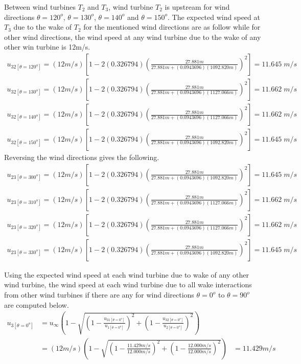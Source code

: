 	Between wind turbines $T_2$ and $T_3$, wind turbine $T_2$ is upstream for wind directions $\theta=120^o$, $\theta=130^o$, $\theta=140^o$ and $\theta=150^o$. The expected wind speed at $T_3$ due to the wake of $T_2$ for the mentioned wind directions are as follow while for other wind directions, the wind speed at any wind turbine due to the wake of any other win turbine is 12m/s.
	\begin{align*}
	    u_{32[\theta=120^o]} = (12m/s) \left[ 1-2(0.326794)\left( \frac{27.881m}{27.881m+(0.0943696) (1092.820m)} \right)^2 \right] = 11.645\;m/s \\
	    u_{32[\theta=130^o]} = (12m/s) \left[ 1-2(0.326794)\left( \frac{27.881m}{27.881m+(0.0943696) (1127.066m)} \right)^2 \right] = 11.662\;m/s \\
	    u_{32[\theta=140^o]} = (12m/s) \left[ 1-2(0.326794)\left( \frac{27.881m}{27.881m+(0.0943696) (1127.066m)} \right)^2 \right] = 11.662\;m/s \\
	    u_{32[\theta=150^o]} = (12m/s) \left[ 1-2(0.326794)\left( \frac{27.881m}{27.881m+(0.0943696) (1092.820m)} \right)^2 \right] = 11.645\;m/s
	\end{align*}
	Reversing the wind directions gives the following.
	\begin{align*}
	    u_{23[\theta=300^o]} = (12m/s) \left[ 1-2(0.326794)\left( \frac{27.881m}{27.881m+(0.0943696) (1092.820m)} \right)^2 \right] = 11.645\;m/s \\
	    u_{23[\theta=310^o]} = (12m/s) \left[ 1-2(0.326794)\left( \frac{27.881m}{27.881m+(0.0943696) (1127.066m)} \right)^2 \right] = 11.662\;m/s \\
	    u_{23[\theta=320^o]} = (12m/s) \left[ 1-2(0.326794)\left( \frac{27.881m}{27.881m+(0.0943696) (1127.066m)} \right)^2 \right] = 11.662\;m/s \\
	    u_{23[\theta=330^o]} = (12m/s) \left[ 1-2(0.326794)\left( \frac{27.881m}{27.881m+(0.0943696) (1092.820m)} \right)^2 \right] = 11.645\;m/s
	\end{align*}
	
	Using the expected wind speed at each wind turbine due to wake of any other wind turbine, the wind speed at each wind turbine due to all wake interactions from other wind turbines if there are any for  wind directions $\theta=0^o$ to $\theta=90^o$ are computed below.
	\begin{align*}
	    u_{3[\theta=0^o]} &= u_\infty\left( 1-\sqrt{\left( 1-\frac{u_{31[\theta=0^o]}}{u_{1[\theta=0^o]}} \right)^2 + \left( 1-\frac{u_{32[\theta=0^o]}}{u_{2[\theta=0^o]}} \right)^2} \right) \\
	    &= (12m/s)\left( 1-\sqrt{\left( 1-\frac{11.429m/s}{12.000m/s} \right)^2 + \left( 1-\frac{12.000m/s}{12.000m/s} \right)^2} \right)
	    &=11.429m/s
	\end{align*}
	
